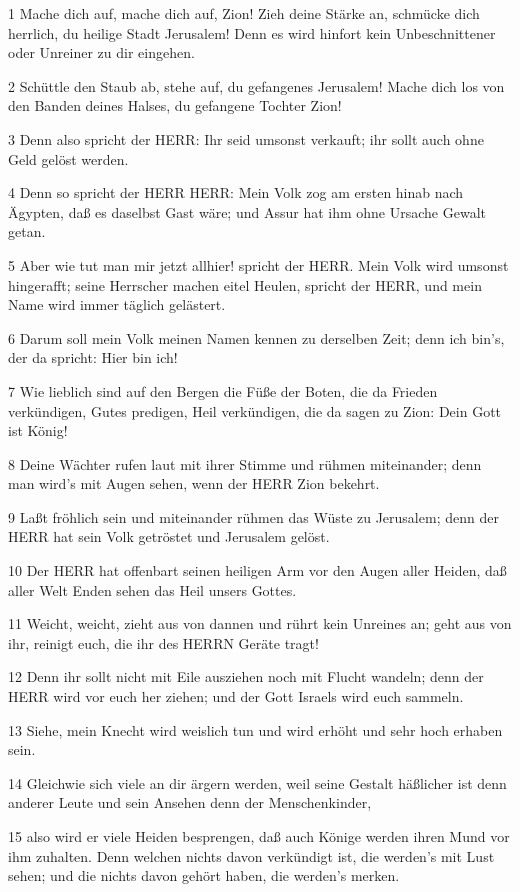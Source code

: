 \par 1 Mache dich auf, mache dich auf, Zion! Zieh deine Stärke an, schmücke dich herrlich, du heilige Stadt Jerusalem! Denn es wird hinfort kein Unbeschnittener oder Unreiner zu dir eingehen.
\par 2 Schüttle den Staub ab, stehe auf, du gefangenes Jerusalem! Mache dich los von den Banden deines Halses, du gefangene Tochter Zion!
\par 3 Denn also spricht der HERR: Ihr seid umsonst verkauft; ihr sollt auch ohne Geld gelöst werden.
\par 4 Denn so spricht der HERR HERR: Mein Volk zog am ersten hinab nach Ägypten, daß es daselbst Gast wäre; und Assur hat ihm ohne Ursache Gewalt getan.
\par 5 Aber wie tut man mir jetzt allhier! spricht der HERR. Mein Volk wird umsonst hingerafft; seine Herrscher machen eitel Heulen, spricht der HERR, und mein Name wird immer täglich gelästert.
\par 6 Darum soll mein Volk meinen Namen kennen zu derselben Zeit; denn ich bin's, der da spricht: Hier bin ich!
\par 7 Wie lieblich sind auf den Bergen die Füße der Boten, die da Frieden verkündigen, Gutes predigen, Heil verkündigen, die da sagen zu Zion: Dein Gott ist König!
\par 8 Deine Wächter rufen laut mit ihrer Stimme und rühmen miteinander; denn man wird's mit Augen sehen, wenn der HERR Zion bekehrt.
\par 9 Laßt fröhlich sein und miteinander rühmen das Wüste zu Jerusalem; denn der HERR hat sein Volk getröstet und Jerusalem gelöst.
\par 10 Der HERR hat offenbart seinen heiligen Arm vor den Augen aller Heiden, daß aller Welt Enden sehen das Heil unsers Gottes.
\par 11 Weicht, weicht, zieht aus von dannen und rührt kein Unreines an; geht aus von ihr, reinigt euch, die ihr des HERRN Geräte tragt!
\par 12 Denn ihr sollt nicht mit Eile ausziehen noch mit Flucht wandeln; denn der HERR wird vor euch her ziehen; und der Gott Israels wird euch sammeln.
\par 13 Siehe, mein Knecht wird weislich tun und wird erhöht und sehr hoch erhaben sein.
\par 14 Gleichwie sich viele an dir ärgern werden, weil seine Gestalt häßlicher ist denn anderer Leute und sein Ansehen denn der Menschenkinder,
\par 15 also wird er viele Heiden besprengen, daß auch Könige werden ihren Mund vor ihm zuhalten. Denn welchen nichts davon verkündigt ist, die werden's mit Lust sehen; und die nichts davon gehört haben, die werden's merken.

